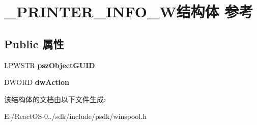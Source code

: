 \hypertarget{struct___p_r_i_n_t_e_r___i_n_f_o__7_w}{}\section{\+\_\+\+P\+R\+I\+N\+T\+E\+R\+\_\+\+I\+N\+F\+O\+\_\+W结构体 参考}
\label{struct___p_r_i_n_t_e_r___i_n_f_o__7_w}
\subsection*{Public 属性}
\begin{DoxyCompactItemize}
\item 
\mbox{\label{struct___p_r_i_n_t_e_r___i_n_f_o__7_w_ad53a41c690ea4b3977852086497f2eb7}} 
L\+P\+W\+S\+TR {\bfseries psz\+Object\+G\+U\+ID}
\item 
\mbox{\label{struct___p_r_i_n_t_e_r___i_n_f_o__7_w_a40ec62e8d8bfbaaa4d3d0255e65216d7}} 
D\+W\+O\+RD {\bfseries dw\+Action}
\end{DoxyCompactItemize}


该结构体的文档由以下文件生成\+:\begin{DoxyCompactItemize}
\item 
E\+:/\+React\+O\+S-\/0../sdk/include/psdk/winspool.\+h\end{DoxyCompactItemize}

